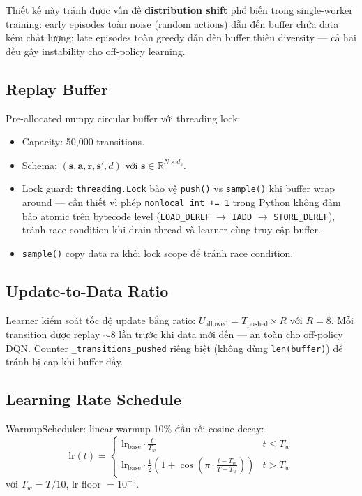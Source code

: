 \documentclass[conference]{IEEEtran}
\begin{document}
Thiết kế này tránh được vấn đề \textbf{distribution shift} phổ biến trong single-worker training: early episodes toàn noise (random actions) dẫn đến buffer chứa data kém chất lượng; late episodes toàn greedy dẫn đến buffer thiếu diversity --- cả hai đều gây instability cho off-policy learning.

\subsection{Replay Buffer}

Pre-allocated numpy circular buffer với threading lock:
\begin{itemize}[leftmargin=*]
    \item Capacity: 50{,}000 transitions.
    \item Schema: $(\mathbf{s}, \mathbf{a}, \mathbf{r}, \mathbf{s}', d)$ với $\mathbf{s} \in \mathbb{R}^{N \times d_s}$.
    \item Lock guard: \texttt{threading.Lock} bảo vệ \texttt{push()} vs \texttt{sample()} khi buffer wrap around --- cần thiết vì phép \texttt{nonlocal int += 1} trong Python không đảm bảo atomic trên bytecode level (\texttt{LOAD\_DEREF} $\to$ \texttt{IADD} $\to$ \texttt{STORE\_DEREF}), tránh race condition khi drain thread và learner cùng truy cập buffer.
    \item \texttt{sample()} copy data ra khỏi lock scope để tránh race condition.
\end{itemize}

\subsection{Update-to-Data Ratio}

Learner kiểm soát tốc độ update bằng ratio: $U_{\text{allowed}} = T_{\text{pushed}} \times R$ với $R = 8$. Mỗi transition được replay $\sim$8 lần trước khi data mới đến --- an toàn cho off-policy DQN. Counter \texttt{\_transitions\_pushed} riêng biệt (không dùng \texttt{len(buffer)}) để tránh bị cap khi buffer đầy.

\subsection{Learning Rate Schedule}

WarmupScheduler: linear warmup 10\% đầu rồi cosine decay:
\begin{equation}
    \text{lr}(t) = \begin{cases}
        \text{lr}_{\text{base}} \cdot \frac{t}{T_w} & t \leq T_w \\[0.5em]
        \text{lr}_{\text{base}} \cdot \frac{1}{2}\left(1 + \cos\left(\pi \cdot \frac{t - T_w}{T - T_w}\right)\right) & t > T_w
    \end{cases}
    \label{eq:lr_schedule}
\end{equation}
với $T_w = T / 10$, lr floor $= 10^{-5}$.
\end{document}
